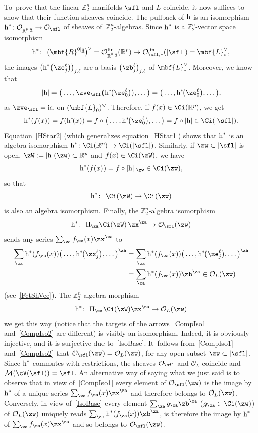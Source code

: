 \documentclass[10pt,a4paper]{amsart}
\newcommand{\rmh}{\textnormal{h}}
\newcommand{\op}[1]{\operatorname{#1}}
\newcommand{\R}{{\mathbb R}}
\newcommand{\Z}{{\mathbb Z}}
\def\ul{\underline}
\def\cM{\cal M}
\def\cO{\mathcal{O}}
\def\cM{\mathcal{M}}
\def\ul{\underline}
\newcommand{\0}{\otimes}
\newcommand{\id}{\op{id}}
\newcommand{\z}{\Z_2^n}
\numberwithin{equation}{section}
\providecommand{\cal}{\mathcal}
\begin{document}
To~prove that the linear $\z$-manifolds $\sfl$ and $L$ coincide, it now suffices to show that their function sheaves coincide. The pullback of $\rmh$ is an isomorphism $\rmh^*\colon \cO_{\R^{p|\ul q}}\to\cO_\sfl$ of sheaves of~$\z$-algebras. Since $\rmh^*$ is a $\z$-vector space isomorphism
\[
\rmh^*\colon\ \big(\mbf{R}^{0|\ul q}\big)^\vee=\cO^{\op{lin}}_{\R^{0|\ul q}}(\R^p)\to \cO^{\op{lin}}_{\sfl,*}(|\sfl|)=\mbf{L}_*^\vee,
\]
the images $\big(\rmh^*\big(\ze_j^\ell\big)\big)_{j,\ell}$ are a basis $\big(\zb_j^\ell\big)_{j,\ell}$ of $\mbf{L}_*^\vee$. Moreover, we know that
\[
|\rmh|=\big(\dots,\zve_\sfl\big(\rmh^*\!\big(\ze_0^\ell\big)\big),\dots\big)=\big(\dots,\rmh^*\!\big(\ze_0^\ell\big),\dots\big),
\]
as $\zve_\sfl=\id$ on $(\mbf{L}_0)^\vee$. Therefore, if $f(x)\in\Ci(\R^p)$, we get
\begin{gather}\label{HStar2}
\rmh^*(f(x))=f(\rmh^*\!(x))=f\circ \big(\dots,\rmh^*\!\big(\ze^\ell_0\big),\dots\big)=f\circ|\rmh|\in\Ci(|\sfl|).
\end{gather}
Equation~\eqref{HStar2} (which generalizes equation~\eqref{HStar1}) shows that $\rmh^*$ is an algebra isomorphism $\rmh^*\colon \Ci(\R^p)\to\Ci(|\sfl|)$. Similarly, if $\zw\subset|\sfl|$ is open, $\zW:=|\rmh|(\zw)\subset\R^p$ and $f(x)\in\Ci(\zW)$, we have
\[
\rmh^*(f(x))=f\circ|\rmh||_{\zw}\in\Ci(\zw),
\]
so that
\begin{gather}\label{IsoBase}
\rmh^*\colon\ \Ci(\zW)\to \Ci(\zw)
\end{gather}
is also an algebra isomorphism. Finally, the $\z$-algebra isomorphism
\begin{gather}\label{CompIso1}
\rmh^*\colon\ \Pi_\za\Ci(\zW)\,\zx^\za\to\cO_\sfl(\zw)
\end{gather}
sends any series $\sum_\za f_\za(x)\zx^\za$ to
\begin{align*}
\sum_\za\rmh^*(f_\za(x))\big(\dots,\rmh^*\!\big(\zx_j^\ell\big),\dots\big)^\za &=\sum_\za\rmh^*(f_\za(x))\big(\dots,\rmh^*\!\big(\ze_j^\ell\big),\dots\big)^\za
\\
&=\sum_\za\rmh^*(f_\za(x))\zb^\za\in\cO_L(\zw)
\end{align*}
(see~\eqref{FctShVec}). The $\z$-algebra morphism
\begin{gather}\label{CompIso2}
\rmh^*\colon\ \Pi_\za\Ci(\zW)\zx^\za\to \cO_L(\zw)
\end{gather}
we get this way (notice that the targets of the arrows~\eqref{CompIso1} and~\eqref{CompIso2} are different) is visibly an isomorphism. Indeed, it is obviously injective, and it is surjective due to~\eqref{IsoBase}. It~follows from~\eqref{CompIso1} and~\eqref{CompIso2} that $\cO_\sfl(\zw)=\cO_L(\zw)$, for any open subset $\zw\subset|\sfl|$. Since $\rmh^*$ commutes with restrictions, the sheaves $\cO_\sfl$ and $\cO_L$ coincide and $\cM(\cV(\sfl))=\sfl$. An alternative way of saying what we just said is to observe that in view of~\eqref{CompIso1} every element of $\cO_\sfl(\zw)$ is the image by $\rmh^*$ of a unique series $\sum_\za f_\za(x)\zx^\za$ and therefore belongs to $\cO_L(\zw)$. Conversely, in view of~\eqref{IsoBase} every element $\sum_\za g_\za \zb^\za$ ($g_\za\in\Ci(\zw)$) of $\cO_{L}(\zw)$ uniquely reads $\sum_\za \rmh^*(f_\za(x))\zb^\za$, is therefore the image by $\rmh^*$ of $\sum_\za f_\za(x)\zx^\za$ and so belongs to $\cO_\sfl(\zw)$.
\end{document}
